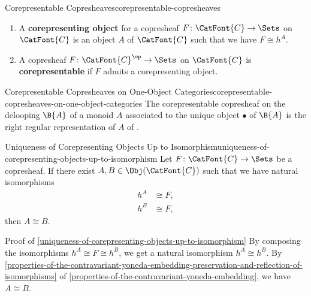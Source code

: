 \begin{definition}{Corepresentable Copresheaves}{corepresentable-copresheaves}
\begin{enumerate}
\begin{itemize}
            \end{itemize}
        \item\label{corepresentable-copresheaves-corepresenting-objects-for-copresheaves}A \textbf{corepresenting object} for a copresheaf $F\colon\CatFont{C}\to\Sets$ on $\CatFont{C}$ is an object $A$ of $\CatFont{C}$ such that we have $F\cong h^{A}$.
        \item\label{corepresentable-copresheaves-corepresentable-copresheaves}A copresheaf $F\colon\CatFont{C}^{\op}\to\Sets$ on $\CatFont{C}$ is \textbf{corepresentable} if $F$ admits a corepresenting object.
    \end{enumerate}
\end{definition}
\begin{example}{Corepresentable Copresheaves on One-Object Categories}{corepresentable-copresheaves-on-one-object-categories}%
    The corepresentable copresheaf on the delooping $\B{A}$ of a monoid $A$ associated to the unique object $\bullet$ of $\B{A}$ is the right regular representation of $A$ of .
\end{example}
\begin{proposition}{Uniqueness of Corepresenting Objects Up to Isomorphism}{uniqueness-of-corepresenting-objects-up-to-isomorphism}%
    Let $F\colon\CatFont{C}\to\Sets$ be a copresheaf. If there exist $A,B\in\Obj(\CatFont{C})$ such that we have natural isomorphisms
    \begin{align*}
        h^{A} &\cong F,\\
        h^{B} &\cong F,
    \end{align*}
    then $A\cong B$.
\end{proposition}
\begin{Proof}{Proof of \cref{uniqueness-of-corepresenting-objects-up-to-isomorphism}}%
    By composing the isomorphisms $h^{A}\cong F\cong h^{B}$, we get a natural isomorphism $h^{A}\cong h^{B}$. By \cref{properties-of-the-contravariant-yoneda-embedding-preservation-and-reflection-of-isomorphisms} of \cref{properties-of-the-contravariant-yoneda-embedding}, we have $A\cong B$.
\end{Proof}
